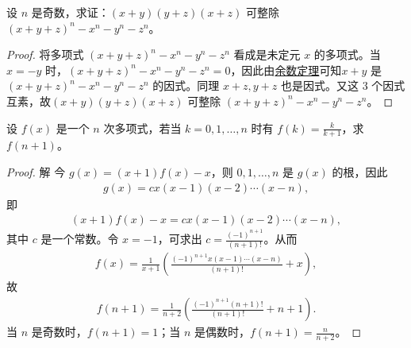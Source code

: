 \documentclass[lang=cn,newtx,10pt,scheme=chinese]{elegantbook}
\begin{document}
\begin{example}
设 $n$ 是奇数，求证：$(x + y)(y + z)(x + z)$ 可整除 $(x + y + z)^n - x^n - y^n - z^n$。
\end{example}
\begin{proof}
将多项式 $(x + y + z)^n - x^n - y^n - z^n$ 看成是未定元 $x$ 的多项式。当 $x = -y$ 时，$(x + y + z)^n - x^n - y^n - z^n = 0$，因此由\hyperref[theorem:余数定理]{余数定理}可知$x + y$ 是 $(x + y + z)^n - x^n - y^n - z^n$ 的因式。同理 $x + z, y + z$ 也是因式。又这 3 个因式互素，故$(x + y)(y + z)(x + z)$ 可整除 $(x + y + z)^n - x^n - y^n - z^n$。
\end{proof}

\begin{example}
设 $f(x)$ 是一个 $n$ 次多项式，若当 $k = 0, 1, \ldots, n$ 时有 $f(k) = \frac{k}{k + 1}$，求 $f(n + 1)$。
\end{example}
\begin{proof}
解 今 $g(x) = (x + 1)f(x) - x$，则 $0, 1, \ldots, n$ 是 $g(x)$ 的根，因此
\begin{align*}
g(x) = c x(x - 1)(x - 2) \cdots (x - n),
\end{align*}
即
\begin{align*}
(x + 1)f(x) - x = c x(x - 1)(x - 2) \cdots (x - n),
\end{align*}
其中 $c$ 是一个常数。令 $x = -1$，可求出 $c = \frac{(-1)^{n+1}}{(n + 1)!}$。从而
\begin{align*}
f(x) = \frac{1}{x + 1} \left( \frac{(-1)^{n+1} x(x - 1) \cdots (x - n)}{(n + 1)!} + x \right),
\end{align*}
故
\begin{align*}
f(n + 1) = \frac{1}{n + 2} \left( \frac{(-1)^{n+1} (n + 1)!}{(n + 1)!} + n + 1 \right).
\end{align*}
当 $n$ 是奇数时，$f(n + 1) = 1$；当 $n$ 是偶数时，$f(n + 1) = \frac{n}{n + 2}$。
\end{proof}
\end{document}
